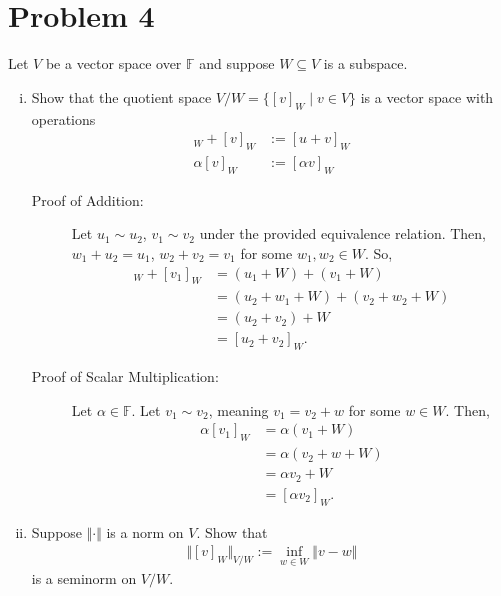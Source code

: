 \documentclass[10pt]{extarticle}
\begin{document}
  \section{Problem 4}%
    Let $V$ be a vector space over $\mathbb{F}$ and suppose $W\subseteq V$ is a subspace.
    \begin{enumerate}[(i)]
      \item Show that the quotient space $V/W = \{[v]_W\mid v\in V\}$ is a vector space with operations
        \begin{align*}
          [u]_W + [v]_W &:=[u+v]_W\\
          \alpha[v]_W &:= [\alpha v]_W
        \end{align*}
        \begin{description}
          \item[Proof of Addition:] Let $u_1\sim u_2$, $v_1 \sim v_2$ under the provided equivalence relation. Then, $w_1 + u_2 = u_1$, $w_2 + v_2 = v_1$ for some $w_1,w_2\in W$. So,
            \begin{align*}
              [u_1]_W + [v_1]_W &= (u_1 + W) + (v_1 + W)\\
                                &= (u_2 + w_1 + W) + (v_2 + w_2 +W)\\
                                &= (u_2 +v_2) + W\\
                                &= [u_2+v_2]_W.
            \end{align*}
          \item[Proof of Scalar Multiplication:] Let $\alpha \in \mathbb{F}$. Let $v_1\sim v_2$, meaning $v_1 = v_2 + w$ for some $w\in W$. Then,
            \begin{align*}
              \alpha[v_1]_W &= \alpha \left(v_1 + W\right)\\
                            &= \alpha \left(v_2 + w + W\right)\\
                            &= \alpha v_2 + W\\
                            &= [\alpha v_2]_W.
            \end{align*}
        \end{description}
      \item Suppose $\Vert \cdot \Vert$ is a norm on $V$. Show that
        \begin{align*}
          \Vert [v]_W\Vert_{V/W} := \inf_{w\in W}\Vert v-w\Vert
        \end{align*}
        is a seminorm on $V/W$.
        \begin{description}

\end{description}
\end{enumerate}
\end{document}
